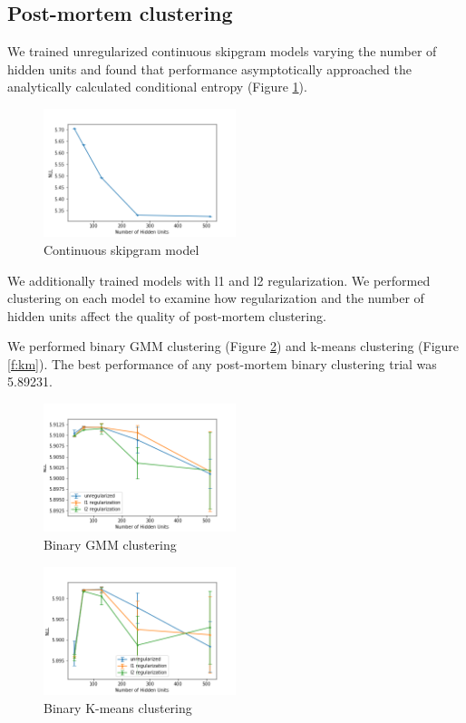 \documentclass[11pt,letterpaper]{article}
\begin{document}
\subsection{Post-mortem clustering}

We trained unregularized continuous skipgram models varying the number of hidden units and found that performance asymptotically approached the analytically calculated conditional entropy (Figure \ref{f:baseline}). 

\begin{figure}
  \caption{Continuous skipgram model}
\label{f:baseline}
  \centering
    \includegraphics[width=0.5\textwidth]{baseline.png}
\end{figure}

We additionally trained models with l1 and l2 regularization. We performed clustering on each model to examine how regularization and the number of hidden units affect the quality of post-mortem clustering. 

We performed binary GMM clustering (Figure \ref{f:bgmm}) and k-means clustering (Figure \ref{f:km}). The best performance of any post-mortem binary clustering trial was 5.89231.

\begin{figure}
  \caption{Binary GMM clustering}
\label{f:bgmm}
  \centering
    \includegraphics[width=0.5\textwidth]{binary_gmm.png}
\end{figure}


\begin{figure}
  \caption{Binary K-means clustering}
\label{f:bkm}
  \centering
    \includegraphics[width=0.5\textwidth]{binary_km.png}
\end{figure}
\end{document}
